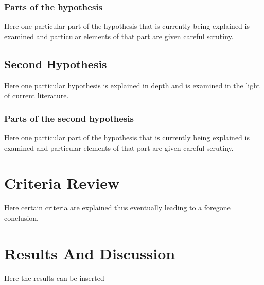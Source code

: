 \subsubsection{Parts of the hypothesis}

Here one particular part of the hypothesis that is
currently being explained is examined and particular
elements of that part are given careful scrutiny.



\subsection{Second Hypothesis}

Here one particular hypothesis is explained in depth
and is examined in the light of current literature.

\subsubsection{Parts of the second hypothesis}

Here one particular part of the hypothesis that is
currently being explained is examined and particular
elements of that part are given careful scrutiny.

\section{Criteria Review}

Here certain criteria are explained thus eventually
leading to a foregone conclusion.

\section{Results And Discussion}

Here the results can be inserted



%
%

